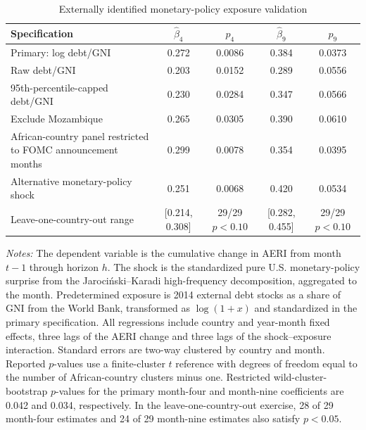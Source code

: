 \begin{table}[htbp]\centering
\caption{Externally identified monetary-policy exposure validation}
\label{tab:external_identification}
\begin{singlespace}\scriptsize
\setlength{\tabcolsep}{3pt}
\begin{tabular}{@{}p{4.7cm}cccc@{}}
\toprule
Specification & $\hat\beta_4$ & $p_4$ & $\hat\beta_9$ & $p_9$\\
\midrule
Primary: log debt/GNI & 0.272 & 0.0086 & 0.384 & 0.0373\\
Raw debt/GNI & 0.203 & 0.0152 & 0.289 & 0.0556\\
95th-percentile-capped debt/GNI & 0.230 & 0.0284 & 0.347 & 0.0566\\
Exclude Mozambique & 0.265 & 0.0305 & 0.390 & 0.0610\\
African-country panel restricted to FOMC announcement months & 0.299 & 0.0078 & 0.354 & 0.0395\\
Alternative monetary-policy shock & 0.251 & 0.0068 & 0.420 & 0.0534\\
\midrule
Leave-one-country-out range & [0.214, 0.308] & 29/29 $p<0.10$ & [0.282, 0.455] & 29/29 $p<0.10$\\
\bottomrule
\end{tabular}
\end{singlespace}
\begin{singlespace}\footnotesize\textit{Notes:} The dependent variable is the cumulative change in AERI from month $t-1$ through horizon $h$. The shock is the standardized pure U.S. monetary-policy surprise from the Jaroci\'{n}ski--Karadi high-frequency decomposition, aggregated to the month. Predetermined exposure is 2014 external debt stocks as a share of GNI from the World Bank, transformed as $\log(1+x)$ and standardized in the primary specification. All regressions include country and year-month fixed effects, three lags of the AERI change and three lags of the shock--exposure interaction. Standard errors are two-way clustered by country and month. Reported $p$-values use a finite-cluster $t$ reference with degrees of freedom equal to the number of African-country clusters minus one. Restricted wild-cluster-bootstrap $p$-values for the primary month-four and month-nine coefficients are 0.042 and 0.034, respectively. In the leave-one-country-out exercise, 28 of 29 month-four estimates and 24 of 29 month-nine estimates also satisfy $p<0.05$.\end{singlespace}
\end{table}

